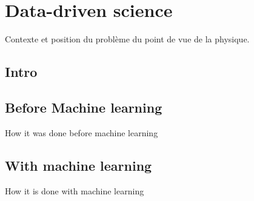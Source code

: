 
\chapter{Data-driven science}  %
\label{chap:intro_phy}
\ifpdf
    \graphicspath{{Chapter1/Figs/Raster/}{Chapter1/Figs/PDF/}{Chapter1/Figs/}}
\else
    \graphicspath{{Chapter1/Figs/Vector/}{Chapter1/Figs/}}
\fi

Contexte et position du problème du point de vue de la physique.

\section{Intro}


\section{Before Machine learning}

How it was done before machine learning

\section{With machine learning}

How it is done with machine learning


